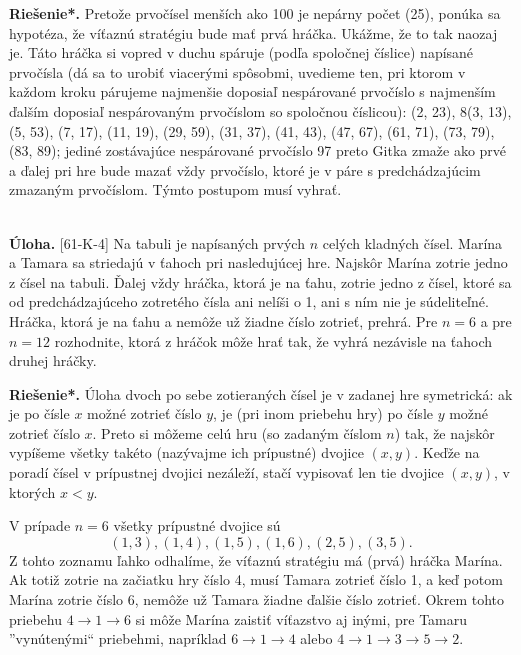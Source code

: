 \documentclass[11pt,a4paper,oneside,final]{book}
\newcommand{\ul}{\textbf{Úloha.} }
\newcommand{\rieh}{\textbf{Riešenie*.} }
\begin{document}
\rieh Pretože prvočísel menších ako 100 je nepárny počet (25), ponúka sa hypotéza, že víťaznú stratégiu bude mať prvá hráčka. Ukážme, že to tak naozaj je. Táto hráčka si vopred v duchu spáruje (podľa spoločnej číslice) napísané prvočísla (dá sa to urobiť viacerými spôsobmi, uvedieme ten, pri ktorom v každom kroku párujeme najmenšie doposiaľ nespárované prvočíslo s najmenším ďalším doposiaľ nespárovaným prvočíslom so spoločnou číslicou): (2, 23), 8(3, 13), (5, 53), (7, 17), (11, 19), (29, 59), (31, 37), (41, 43), (47, 67), (61, 71), (73, 79), (83, 89); jediné zostávajúce nespárované prvočíslo 97 preto Gitka zmaže ako prvé a ďalej pri hre bude mazať vždy prvočíslo, ktoré je v páre s predchádzajúcim zmazaným prvočíslom. Týmto postupom musí vyhrať.\\
\\
\begin{tcolorbox}[breakable,notitle,boxrule=0pt,colback=light-gray,colframe=light-gray]\ul [61-K-4] Na tabuli je napísaných prvých $n$ celých kladných čísel. Marína a Tamara sa striedajú v ťahoch pri nasledujúcej hre. Najskôr Marína zotrie jedno z čísel na tabuli. Ďalej vždy hráčka, ktorá je na ťahu, zotrie jedno z čísel, ktoré sa od predchádzajúceho zotretého čísla ani nelíši o 1, ani s ním nie je súdeliteľné. Hráčka, ktorá je na ťahu a nemôže už žiadne číslo zotrieť, prehrá. Pre $n = 6$ a pre $n = 12$ rozhodnite, ktorá z hráčok môže hrať tak, že vyhrá nezávisle na ťahoch druhej hráčky.

\end{tcolorbox}

\rieh Úloha dvoch po sebe zotieraných čísel je v zadanej hre symetrická: ak je po čísle $x$ možné zotrieť číslo $y$, je (pri inom priebehu hry) po čísle $y$ možné zotrieť číslo $x$. Preto si môžeme celú hru (so zadaným číslom $n$)  tak, že najskôr vypíšeme všetky takéto (nazývajme ich prípustné) dvojice $(x, y)$. Keďže na poradí čísel v prípustnej dvojici nezáleží, stačí vypisovať len tie dvojice $(x, y)$, v ktorých $x < y$.

V prípade $n = 6$ všetky prípustné dvojice sú
$$(1, 3), (1, 4), (1, 5), (1, 6), (2, 5), (3, 5).$$
Z tohto zoznamu ľahko odhalíme, že víťaznú stratégiu má (prvá) hráčka Marína. Ak totiž zotrie na začiatku hry číslo 4, musí Tamara zotrieť číslo 1, a keď potom Marína zotrie číslo 6, nemôže už Tamara žiadne ďalšie číslo zotrieť. Okrem tohto priebehu $4 \rightarrow 1\rightarrow 6$ si môže Marína zaistiť víťazstvo aj inými, pre Tamaru ”vynútenými“ priebehmi, napríklad $6\rightarrow 1 \rightarrow 4$ alebo $4 \rightarrow 1 \rightarrow 3 \rightarrow 5 \rightarrow 2$.
\end{document}
